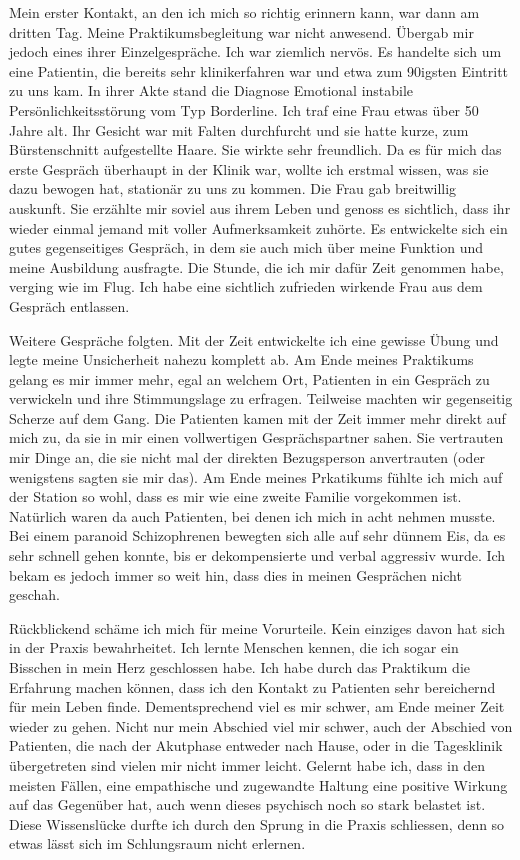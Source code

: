 \documentclass[jou,apacite]{apa6}
\begin{document}
Mein erster Kontakt, an den ich mich so richtig erinnern kann, war dann am dritten Tag. Meine Praktikumsbegleitung war nicht anwesend. Übergab mir jedoch eines ihrer Einzelgespräche. Ich war ziemlich nervös. Es handelte sich um eine Patientin, die bereits sehr klinikerfahren war und etwa zum 90igsten Eintritt zu uns kam. In ihrer Akte stand die Diagnose Emotional instabile Persönlichkeitsstörung vom Typ Borderline. Ich traf eine Frau etwas über 50 Jahre alt. Ihr Gesicht war mit Falten durchfurcht und sie hatte kurze, zum Bürstenschnitt aufgestellte Haare. Sie wirkte sehr freundlich. Da es für mich das erste Gespräch überhaupt in der Klinik war, wollte ich erstmal wissen, was sie dazu bewogen hat, stationär zu uns zu kommen. Die Frau gab breitwillig auskunft. Sie erzählte mir soviel aus ihrem Leben und genoss es sichtlich, dass ihr wieder einmal jemand mit voller Aufmerksamkeit zuhörte. Es entwickelte sich ein gutes gegenseitiges Gespräch, in dem sie auch mich über meine Funktion und meine Ausbildung ausfragte. Die Stunde, die ich mir dafür Zeit genommen habe, verging wie im Flug. Ich habe eine sichtlich zufrieden wirkende Frau aus dem Gespräch entlassen.

Weitere Gespräche folgten. Mit der Zeit entwickelte ich eine gewisse Übung und legte meine Unsicherheit nahezu komplett ab. Am Ende meines Praktikums gelang es mir immer mehr, egal an welchem Ort, Patienten in ein Gespräch zu verwickeln und ihre Stimmungslage zu erfragen. Teilweise machten wir gegenseitig Scherze auf dem Gang. Die Patienten kamen mit der Zeit immer mehr direkt auf mich zu, da sie in mir einen vollwertigen Gesprächspartner sahen. Sie vertrauten mir Dinge an, die sie nicht mal der direkten Bezugsperson anvertrauten (oder wenigstens sagten sie mir das). Am Ende meines Prkatikums fühlte ich mich auf der Station so wohl, dass es mir wie eine zweite Familie vorgekommen ist. Natürlich waren da auch Patienten, bei denen ich mich in acht nehmen musste. Bei einem paranoid Schizophrenen bewegten sich alle auf sehr dünnem Eis, da es sehr schnell gehen konnte, bis er dekompensierte und verbal aggressiv wurde. Ich bekam es jedoch immer so weit hin, dass dies in meinen Gesprächen nicht geschah.

Rückblickend schäme ich mich für meine Vorurteile. Kein einziges davon hat sich in der Praxis bewahrheitet. Ich lernte Menschen kennen, die ich sogar ein Bisschen in mein Herz geschlossen habe. Ich habe durch das Praktikum die Erfahrung machen können, dass ich den Kontakt zu Patienten sehr bereichernd für mein Leben finde. Dementsprechend viel es mir schwer, am Ende meiner Zeit wieder zu gehen. Nicht nur mein Abschied viel mir schwer, auch der Abschied von Patienten, die nach der Akutphase entweder nach Hause, oder in die Tagesklinik übergetreten sind vielen mir nicht immer leicht. Gelernt habe ich, dass in den meisten Fällen, eine empathische und zugewandte Haltung eine positive Wirkung auf das Gegenüber hat, auch wenn dieses psychisch noch so stark belastet ist. Diese Wissenslücke durfte ich durch den Sprung in die Praxis schliessen, denn so etwas lässt sich im Schlungsraum nicht erlernen. 
\end{document}
